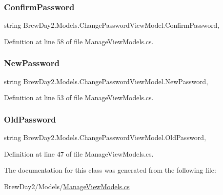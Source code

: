 \subsubsection{\texorpdfstring{Confirm\+Password}{ConfirmPassword}}
{\footnotesize\ttfamily string Brew\+Day2.\+Models.\+Change\+Password\+View\+Model.\+Confirm\+Password\hspace{0.3cm}{\ttfamily [get]}, {\ttfamily [set]}}



Definition at line 58 of file Manage\+View\+Models.\+cs.

\mbox{\label{class_brew_day2_1_1_models_1_1_change_password_view_model_aae850d1331308b7aada72d07c4b6eb46}} 
\subsubsection{\texorpdfstring{New\+Password}{NewPassword}}
{\footnotesize\ttfamily string Brew\+Day2.\+Models.\+Change\+Password\+View\+Model.\+New\+Password\hspace{0.3cm}{\ttfamily [get]}, {\ttfamily [set]}}



Definition at line 53 of file Manage\+View\+Models.\+cs.

\mbox{\label{class_brew_day2_1_1_models_1_1_change_password_view_model_a576d062ce3921fbe8e282f88fd05bebb}} 
\subsubsection{\texorpdfstring{Old\+Password}{OldPassword}}
{\footnotesize\ttfamily string Brew\+Day2.\+Models.\+Change\+Password\+View\+Model.\+Old\+Password\hspace{0.3cm}{\ttfamily [get]}, {\ttfamily [set]}}



Definition at line 47 of file Manage\+View\+Models.\+cs.



The documentation for this class was generated from the following file\+:\begin{DoxyCompactItemize}
\item 
Brew\+Day2/\+Models/\mbox{\hyperlink{_manage_view_models_8cs}{Manage\+View\+Models.\+cs}}\end{DoxyCompactItemize}
